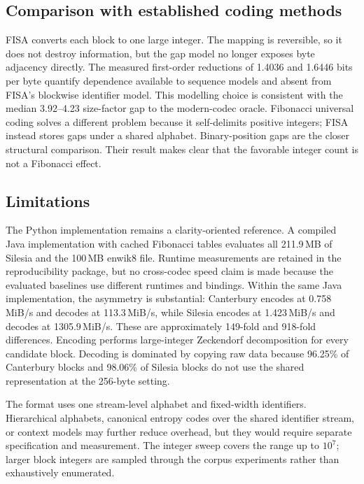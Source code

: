 \documentclass[a4paper,fleqn]{cas-dc}
\begin{document}
\subsection{Comparison with established coding methods}

FISA converts each block to one large integer. The mapping is reversible, so
it does not destroy information, but the gap model no longer exposes byte
adjacency directly. The measured first-order reductions of 1.4036 and 1.6446
bits per byte quantify dependence available to sequence models and absent
from FISA's blockwise identifier model. This modelling choice is consistent
with the median 3.92--4.23 size-factor gap to the modern-codec oracle.
Fibonacci universal coding solves a
different problem because it self-delimits positive integers; FISA instead
stores gaps under a shared alphabet. Binary-position gaps are the closer
structural comparison. Their result makes clear that the favorable integer
count is not a Fibonacci effect.

\subsection{Limitations}

The Python implementation remains a clarity-oriented reference. A compiled
Java implementation with cached Fibonacci tables evaluates all 211.9\,MB of
Silesia and the 100\,MB enwik8 file. Runtime measurements are retained in the
reproducibility package, but no cross-codec speed claim is made because the
evaluated baselines use different runtimes and bindings.
Within the same Java implementation, the asymmetry is substantial:
Canterbury encodes at 0.758\,MiB/s and decodes at 113.3\,MiB/s, while Silesia
encodes at 1.423\,MiB/s and decodes at 1305.9\,MiB/s. These are approximately
149-fold and 918-fold differences. Encoding performs large-integer
Zeckendorf decomposition for every candidate block. Decoding is dominated by
copying raw data because 96.25\% of Canterbury blocks and 98.06\% of Silesia
blocks do not use the shared representation at the 256-byte setting.

The format uses one stream-level alphabet and fixed-width
identifiers. Hierarchical alphabets, canonical entropy codes over the shared
identifier stream, or context models may further reduce overhead, but they
would require separate specification and measurement. The integer sweep covers
the range up to $10^7$; larger block integers are sampled through the corpus
experiments rather than exhaustively enumerated.
\end{document}

